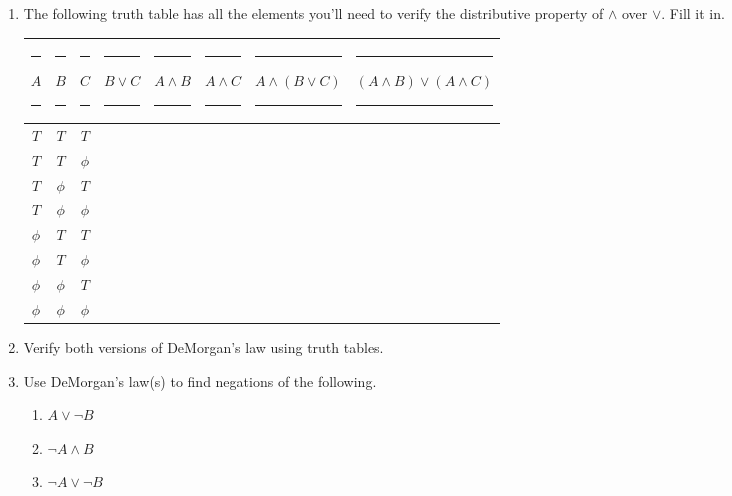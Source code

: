 \documentclass{amsart}
\begin{document}
\begin{enumerate}
\vfill

\newpage

\item The following truth table has all the elements you'll need to verify the distributive property of $\land$ over $\lor$.  Fill it in.

\vspace{.3in}

\hspace{-1in}\begin{tabular}{c|cc||c|c|c||c|c}
\rule{4pt}{0pt} $A$ \rule{4pt}{0pt} & \rule{4pt}{0pt} $B$ \rule{4pt}{0pt} & \rule{4pt}{0pt} $C$ \rule{4pt}{0pt} & \rule{4pt}{0pt} $B \lor C$ \rule{4pt}{0pt} & \rule{4pt}{0pt} $A \land B$ \rule{4pt}{0pt} & \rule{4pt}{0pt} $A \land C$ \rule{4pt}{0pt} & \rule{4pt}{0pt} $A \land (B \lor C)$ \rule{4pt}{0pt} & \rule{4pt}{0pt} $(A \land B) \lor (A \land C)$ \rule{4pt}{0pt} \\ \hline
 \rule[-4pt]{0pt}{20pt} $T$ & $T$ & $T$ & & & & & \\
 \rule[-4pt]{0pt}{20pt} $T$ & $T$ & $\phi$ & & & & & \\
 \rule[-4pt]{0pt}{20pt} $T$ & $\phi$ & $T$ & & & & & \\
 \rule[-4pt]{0pt}{20pt} $T$ & $\phi$ & $\phi$ & & & & & \\ \hline
 \rule[-4pt]{0pt}{20pt} $\phi$ & $T$ & $T$ & & & & & \\
 \rule[-4pt]{0pt}{20pt} $\phi$ & $T$ & $\phi$ & & & & & \\
 \rule[-4pt]{0pt}{20pt} $\phi$ & $\phi$ & $T$ & & & & & \\
 \rule[-4pt]{0pt}{20pt} $\phi$ & $\phi$ & $\phi$ & & & & & \\
\end{tabular}

\vspace{.3in}

\item Verify both versions of DeMorgan's law using truth tables.

\vfill

\newpage

\item Use DeMorgan's law(s) to find negations of the following.

\vspace{.3in}

\begin{enumerate}
\item \rule[-4pt]{0pt}{20pt} $ A \lor \lnot B $
\item \rule[-4pt]{0pt}{20pt} $ \lnot A \land B $
\item \rule[-4pt]{0pt}{20pt} $ \lnot A \lor \lnot B $
\end{enumerate}


\end{enumerate}
\end{document}

